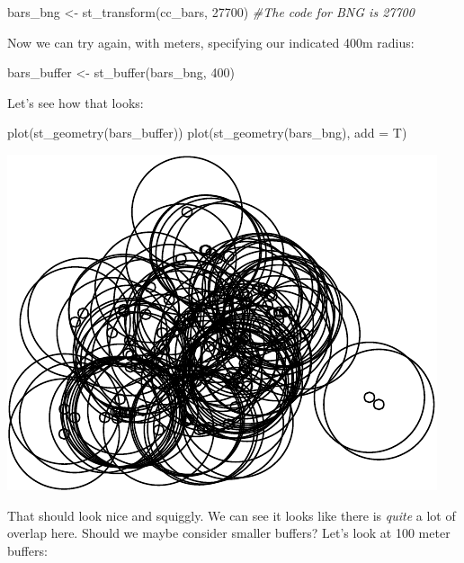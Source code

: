 \documentclass[
]{book}
\newenvironment{Shaded}{\begin{snugshade}}{\end{snugshade}}
\newcommand{\AttributeTok}[1]{\textcolor[rgb]{0.77,0.63,0.00}{#1}}
\newcommand{\CommentTok}[1]{\textcolor[rgb]{0.56,0.35,0.01}{\textit{#1}}}
\newcommand{\DecValTok}[1]{\textcolor[rgb]{0.00,0.00,0.81}{#1}}
\newcommand{\FunctionTok}[1]{\textcolor[rgb]{0.00,0.00,0.00}{#1}}
\newcommand{\NormalTok}[1]{#1}
\newcommand{\OtherTok}[1]{\textcolor[rgb]{0.56,0.35,0.01}{#1}}
\begin{document}
\begin{Shaded}
\begin{Highlighting}[]
\NormalTok{bars\_bng }\OtherTok{\textless{}{-}} \FunctionTok{st\_transform}\NormalTok{(cc\_bars, }\DecValTok{27700}\NormalTok{) }\CommentTok{\#The code for BNG is 27700}
\end{Highlighting}
\end{Shaded}

Now we can try again, with meters, specifying our indicated 400m radius:

\begin{Shaded}
\begin{Highlighting}[]
\NormalTok{bars\_buffer }\OtherTok{\textless{}{-}} \FunctionTok{st\_buffer}\NormalTok{(bars\_bng, }\DecValTok{400}\NormalTok{)}
\end{Highlighting}
\end{Shaded}

Let's see how that looks:

\begin{Shaded}
\begin{Highlighting}[]
\FunctionTok{plot}\NormalTok{(}\FunctionTok{st\_geometry}\NormalTok{(bars\_buffer))}
\FunctionTok{plot}\NormalTok{(}\FunctionTok{st\_geometry}\NormalTok{(bars\_bng), }\AttributeTok{add =}\NormalTok{ T)}
\end{Highlighting}
\end{Shaded}

\includegraphics{crime_mapping_files/figure-latex/plot_buffers-1.pdf}

That should look nice and squiggly. We can see it looks like there is \emph{quite} a lot of overlap here. Should we maybe consider smaller buffers? Let's look at 100 meter buffers:
\end{document}
